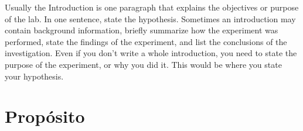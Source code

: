 
 
Usually the Introduction is one paragraph that explains the objectives or purpose of the lab. In one sentence, state the hypothesis. Sometimes an introduction may contain background information, briefly summarize how the experiment was performed, state the findings of the experiment, and list the conclusions of the investigation. Even if you don't write a whole introduction, you need to state the purpose of the experiment, or why you did it. This would be where you state your hypothesis.

\section{Propósito}
\label{proposito}